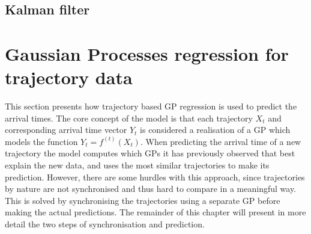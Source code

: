 
\subsection{Kalman filter}



\section{Gaussian Processes regression for trajectory data}
This section presents how trajectory based GP regression is used to predict the arrival times. The core concept of the model is that each trajectory $X_t$ and corresponding arrival time vector $Y_t$ is considered a realisation of a GP which models the function $Y_t = f^{(t)}(X_t)$. When predicting the arrival time of a new trajectory the model computes which GPs it has previously observed that best explain the new data, and uses the most similar trajectories to make its prediction. However, there are some hurdles with this approach, since trajectories by nature are not synchronised and thus hard to compare in a meaningful way. This is solved by synchronising the trajectories using a separate GP before making the actual predictions. The remainder of this chapter will present in more detail the two steps of synchronisation and prediction.

